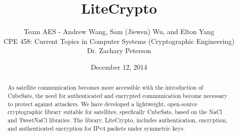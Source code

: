 \documentclass[12pt]{article}
\begin{document}
\title{\vfill LiteCrypto} %
\author{
Team AES - Andrew Wang, Sam (Jiewen) Wu, and Elton Yang \vspace{10pt} \\
CPE 458: Current Topics in Computer Systems (Cryptographic Engineering)  \vspace{10pt} \\
Dr. Zachary Peterson \vspace{10pt} \\
}
\date{December 12, 2014} %

\maketitle

\vfill  %
\begin{abstract}
As satellite communication becomes more accessible with the introduction of CubeSats, the need for authenticated and encrypted communication become necessary to protect against attackers. We have developed a lightweight, open-source cryptographic library suitable for satellites, specfically CubeSats, based on the NaCl and TweetNaCl libraries. The library, LiteCrypto, includes authentication, encryption, and authenticated encryption for IPv4 packets under symmetric keys.

\end{abstract}
\thispagestyle{empty} %
\newpage
\thispagestyle{empty}
\tableofcontents
\thispagestyle{empty}
\mbox{}
\newpage
\end{document}
